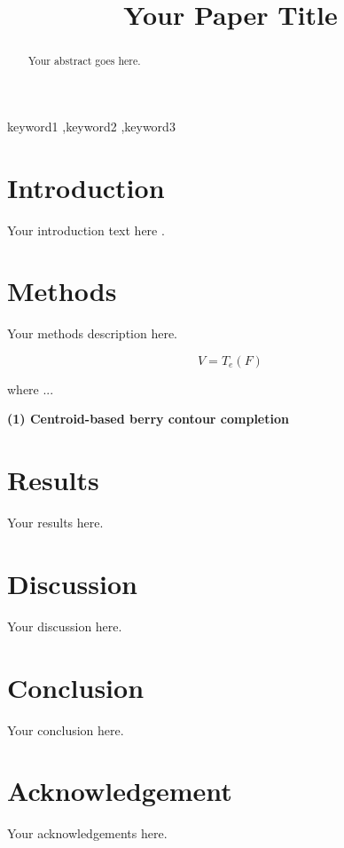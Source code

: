 \documentclass[preprint,12pt,authoryear]{elsarticle}
\begin{document}
\linenumbers

\begin{frontmatter}
\title{Your Paper Title}

\author{}


\begin{abstract}
Your abstract goes here.
\end{abstract}



\begin{keyword}
keyword1 \sep keyword2 \sep keyword3
\end{keyword}

\end{frontmatter}


\section{Introduction}
\label{sec:introduction}
Your introduction text here \citep{iwahashi_drought_2022}.

\section{Methods}
\label{sec:methods}
Your methods description here.

\begin{equation}
    V = T_e(F)
    \label{eq:3}
\end{equation}

{\raggedright where ...}

{\raggedright\textbf{(1) Centroid-based berry contour completion}}

\section{Results}
\label{sec:results}
Your results here.

\section{Discussion}
\label{sec:discussion}
Your discussion here.

\section{Conclusion}
\label{sec:conclusion}
Your conclusion here.

\section*{Acknowledgement}
Your acknowledgements here.



\end{document}
